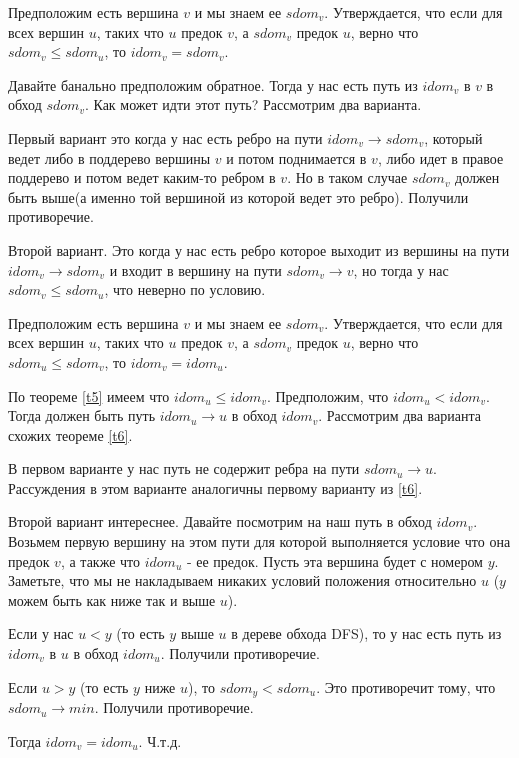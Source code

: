 \documentclass[a4paper, fontsize=12pt]{article}
\begin{document}
\begin{theorem} \label{t6}
Предположим есть вершина $v$ и мы знаем ее $sdom_v$. Утверждается, что если для всех вершин $u$, таких что $u$ предок $v$, а $sdom_v$ предок $u$, верно что $sdom_v \leq sdom_u$, то $idom_v = sdom_v$. 

Давайте банально предположим обратное. Тогда у нас есть путь из $idom_v$ в $v$ в обход $sdom_v$. Как может идти этот путь? Рассмотрим два варианта.

Первый вариант это когда у нас есть ребро на пути $idom_v \rightarrow sdom_v$, который ведет либо в поддерево вершины $v$ и потом поднимается в $v$, либо идет в правое поддерево и потом ведет каким-то ребром в $v$. Но в таком случае $sdom_v$ должен быть выше(а именно той вершиной из которой ведет это ребро). Получили противоречие.

Второй вариант. Это когда у нас есть ребро которое выходит из вершины на пути $idom_v \rightarrow sdom_v$ и входит в вершину на пути $sdom_v \rightarrow v$, но тогда у нас $sdom_v \leq sdom_u$, что неверно по условию.    
\end{theorem}

\begin{theorem} \label{t7}
Предположим есть вершина $v$ и мы знаем ее $sdom_v$. Утверждается, что если для всех вершин $u$, таких что $u$ предок $v$, а $sdom_v$ предок $u$, верно что $sdom_u \leq sdom_v$, то $idom_v = idom_u$.

По теореме \ref{t5} имеем что $idom_u \leq idom_v$. Предположим, что $idom_u < idom_v$. Тогда должен быть путь $idom_u \rightarrow u$ в обход $idom_v$. Рассмотрим два варианта схожих теореме \ref{t6}.

В первом варианте у нас путь не содержит ребра на пути $sdom_u \rightarrow u$. Рассуждения в этом варианте аналогичны первому варианту из \ref{t6}.

Второй вариант интереснее. Давайте посмотрим на наш путь в обход $idom_v$. Возьмем первую вершину на этом пути для которой выполняется условие что она предок $v$, а также что $idom_u$ - ее предок. Пусть эта вершина будет с номером $y$. Заметьте, что мы не накладываем никаких условий положения относительно $u$ ($y$ можем быть как ниже так и выше $u$).

Если у нас $u < y$ (то есть $y$ выше $u$ в дереве обхода DFS), то у нас есть путь из $idom_v$ в $u$ в обход $idom_u$. Получили противоречие.

Если $u > y$ (то есть $y$ ниже $u$), то $sdom_y < sdom_u$. Это противоречит тому, что $sdom_u \rightarrow min$. Получили противоречие.

Тогда $idom_v = idom_u$. Ч.т.д. 
\end{theorem}
\end{document}
